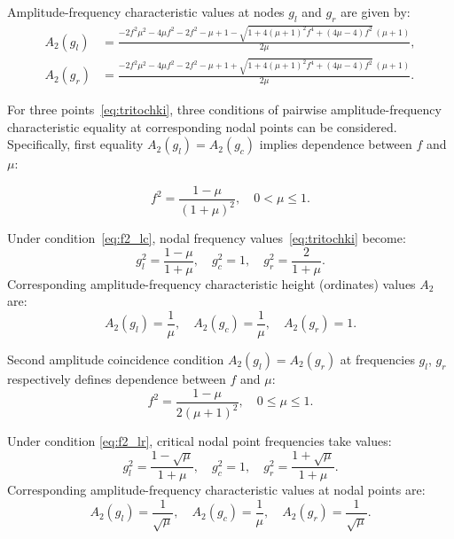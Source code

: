 \documentclass[12pt, a4paper]{article}
\begin{document}
	Amplitude-frequency characteristic values at nodes $g_l$ and $g_r$ are given by:
	\begin{align}
		A_2(g_l) &= \frac{-2 f^{2} \mu^{2}-4 \mu f^{2}-2 f^{2}-\mu+1-\sqrt{1+4 \left(\mu +1\right)^{2} f^{4}+\left(4 \mu-4\right) f^{2}}\, \left(\mu+1\right)}{2 \mu}, \\
		A_2(g_r) &= \frac{-2 f^{2} \mu^{2}-4 \mu f^{2}-2 f^{2}-\mu+1+\sqrt{1+4 \left(\mu +1\right)^{2} f^{4}+\left(4 \mu-4\right) f^{2}}\, \left(\mu+1\right)}{2 \mu}.
	\end{align}
	
	For three points~\eqref{eq:tritochki}, three conditions of pairwise amplitude-frequency characteristic equality at corresponding nodal points can be considered. Specifically, first equality $A_2(g_l)=A_2(g_c)$ implies dependence between $f$ and $\mu$:
	
	\begin{equation}
		f^2 = \frac{1-\mu}{(1+\mu)^2}, \quad 0 < \mu \le 1.
		\label{eq:f2_lc}
	\end{equation}
	
	Under condition~\eqref{eq:f2_lc}, nodal frequency values~\eqref{eq:tritochki} become:
	\begin{equation}
		g_l^2 = \frac{1-\mu}{1+\mu}, \quad 
		g_c^2 = 1, \quad 
		g_r^2 = \frac{2}{1+\mu}.
	\end{equation}
	Corresponding amplitude-frequency characteristic height (ordinates) values $A_2$ are:
	\begin{equation}
		A_2(g_l) = \frac{1}{\mu}, \quad A_2(g_c) = \frac{1}{\mu}, \quad A_2(g_r) = 1.
	\end{equation}
	
	Second amplitude coincidence condition $A_2(g_l)=A_2(g_r)$ at frequencies $g_l$, $g_r$ respectively defines dependence between $f$ and $\mu$:
	\begin{equation}
		f^2 = \frac{1-\mu}{2(\mu+1)^2}, \quad 0 \le \mu \le 1.
		\label{eq:f2_lr}
	\end{equation}
	
	Under condition \eqref{eq:f2_lr}, critical nodal point frequencies take values:
	\begin{equation}
		g_l^2 = \frac{1-\sqrt{\mu}}{1+\mu}, \quad
		g_c^2 = 1, \quad
		g_r^2 = \frac{1+\sqrt{\mu}}{1+\mu}.
	\end{equation}
	Corresponding amplitude-frequency characteristic values at nodal points are:
	\begin{equation}
		A_2(g_l) = \frac{1}{\sqrt{\mu}}, \quad 
		A_2(g_c) = \frac{1}{\mu}, \quad 
		A_2(g_r) = \frac{1}{\sqrt{\mu}}.
	\end{equation}
	
\end{document}
